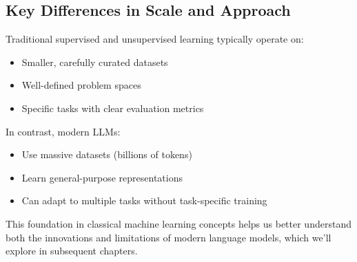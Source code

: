 \subsection{Key Differences in Scale and Approach}

Traditional supervised and unsupervised learning typically operate on:
\begin{itemize}[noitemsep]
    \item Smaller, carefully curated datasets
    \item Well-defined problem spaces
    \item Specific tasks with clear evaluation metrics
\end{itemize}

In contrast, modern LLMs:
\begin{itemize}[noitemsep]
    \item Use massive datasets (billions of tokens)
    \item Learn general-purpose representations
    \item Can adapt to multiple tasks without task-specific training
\end{itemize}

This foundation in classical machine learning concepts helps us better understand both the innovations and limitations of modern language models, which we'll explore in subsequent chapters. 